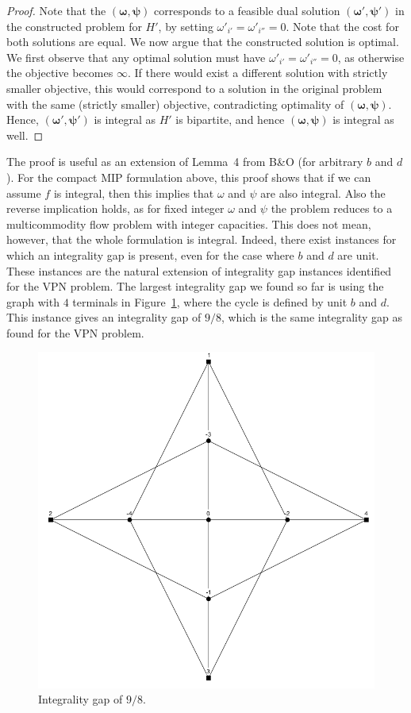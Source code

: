 \begin{proof}
    Note that the $(\boldsymbol \omega, \boldsymbol \psi)$ corresponds to a feasible dual solution $(\boldsymbol \omega', \boldsymbol \psi')$ in the constructed problem for $H'$, by setting $\omega'_{i'} = \omega'_{i''} = 0$.
    Note that the cost for both solutions are equal.
    We now argue that the constructed solution is optimal.
    We first observe that any optimal solution must have $\omega'_{i'} = \omega'_{i''} = 0$, as otherwise the objective becomes $\infty$.
    If there would exist a different solution with strictly smaller objective, this would correspond to a solution in the original problem with the same (strictly smaller) objective, contradicting optimality of $(\boldsymbol \omega, \boldsymbol \psi)$.
    Hence, $(\boldsymbol \omega', \boldsymbol \psi')$ is integral as $H'$ is bipartite, and hence $(\boldsymbol \omega, \boldsymbol \psi)$ is integral as well.
\end{proof}

The proof is useful as an extension of Lemma~4 from B\&O (for arbitrary $b$ and $d$).
For the compact MIP formulation above, this proof shows that if we can assume $f$ is integral, then this implies that $\omega$ and $\psi$ are also integral.
Also the reverse implication holds, as for fixed integer $\omega$ and $\psi$ the problem reduces to a multicommodity flow problem with integer capacities.
This does not mean, however, that the whole formulation is integral.
Indeed, there exist instances for which an integrality gap is present, even for the case where $b$ and $d$ are unit.
These instances are the natural extension of integrality gap instances identified for the VPN problem.
The largest integrality gap we found so far is using the graph with $4$ terminals in Figure~\ref{fig:gap4}, where the cycle is defined by unit $b$ and $d$.
This instance gives an integrality gap of $9/8$, which is the same integrality gap as found for the VPN problem.

\begin{figure}[h]
    \centering
    \includegraphics[width=.45\textwidth]{gap4}
    \caption{Integrality gap of $9/8$.} \label{fig:gap4}
\end{figure}
